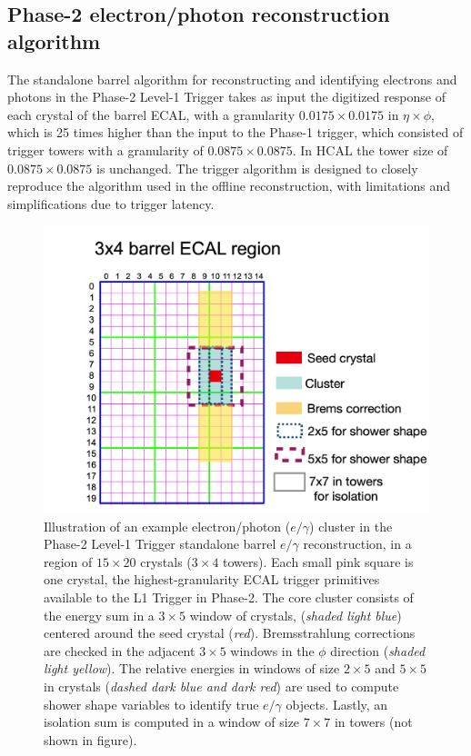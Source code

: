 \subsection{Phase-2 electron/photon reconstruction algorithm}
\label{section:phase-2-egamma-reconstruction-algorithm}

The standalone barrel algorithm for reconstructing and identifying electrons and photons in the Phase-2 Level-1 Trigger takes as input the digitized response of each crystal of the barrel ECAL, with a granularity $0.0175 \times 0.0175$ in $\eta \times \phi$, which is 25 times higher than the input to the Phase-1 trigger, which consisted of trigger towers with a granularity of $0.0875 \times 0.0875$. In HCAL the tower size of $0.0875 \times 0.0875$ is unchanged. The trigger algorithm is designed to closely reproduce the algorithm used in the offline reconstruction, with limitations and simplifications due to trigger latency. 

\begin{figure}[ht]
    \centering
    \includegraphics[width=12cm]{figures/ch-3-phase2/phase-2-cluster-footprint.png}
    \caption{Illustration of an example electron/photon ($e/\gamma$) cluster in the Phase-2 Level-1 Trigger standalone barrel $e/\gamma$ reconstruction, in a region of $15\times 20$ crystals ($3\times 4$ towers). Each small pink square is one crystal, the highest-granularity ECAL trigger primitives available to the L1 Trigger in Phase-2. The core cluster consists of the energy sum in a $3\times 5$ window of crystals, (\textit{shaded light blue}) centered around the seed crystal (\textit{red}). Bremsstrahlung corrections are checked in the adjacent $3\times 5$ windows in the $\phi$ direction (\textit{shaded light yellow}). The relative energies in windows of size $2\times 5$ and $5\times 5$ in crystals (\textit{dashed dark blue and dark red}) are used to compute shower shape variables to identify true $e/\gamma$ objects. Lastly, an isolation sum is computed in a window of size $7\times 7$ in towers (not shown in figure).}
    \label{fig:phase-2-cluster-footprint}
\end{figure}


